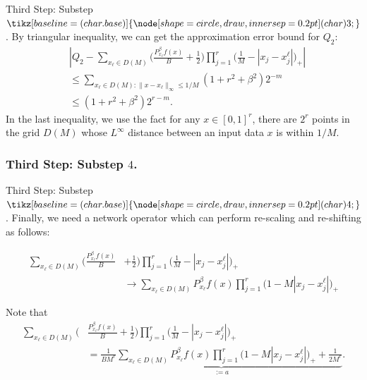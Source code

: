 \documentclass{if-beamer}
\newcommand*\circled[1]{\tikz[baseline=(char.base)]{
            \node[shape=circle,draw,inner sep=0.2pt] (char) {#1};}}
\begin{document}
\begin{frame}{Third Step: Substep $\circled{3}$.}
By triangular inequality, we can get the approximation error bound for $Q_2$:
\begin{align*}
    &\left| Q_{2} - \sum_{x_{\ell}\in D(M)}\bigg( \frac{P_{x_{\ell}}^{\beta}f(x)}{B}+\frac{1}{2}\bigg)\prod_{j=1}^{r}\bigg( \frac{1}{M} - |x_{j}-x_{j}^{\ell}| \bigg)_{+}  \right| \\
    &\leq \sum_{x_{\ell}\in D(M): \|x-x_{\ell}\|_{\infty}\leq 1/M} (1+r^{2}+\beta^{2}) 2^{-m} \\
    &\leq (1+r^{2}+\beta^{2}) 2^{r-m}.
\end{align*}
In the last inequality, we use the fact for any $x\in[0,1]^{r}$, there are $2^{r}$ points in the grid $D(M)$ whose $L^{\infty}$ distance between an input data $x$ is within $1/M$.
\end{frame}

\subsubsection{Third Step: Substep $4$.}
\begin{frame}{Third Step: Substep $\circled{4}$.}
Finally, we need a network operator which can perform re-scaling and re-shifting as follows:

\begin{align*}
    \sum_{x_{\ell}\in D(M)}\bigg( \frac{P_{x_{\ell}}^{\beta}f(x)}{B}&+\frac{1}{2}\bigg)\prod_{j=1}^{r}\bigg( \frac{1}{M} - |x_{j}-x_{j}^{\ell}| \bigg)_{+} \\
    &\rightarrow{\sum_{x_{\ell}\in D(M)} P_{x_{\ell}}^{\beta}f(x)\prod_{j=1}^{r}\bigg( 1 - M|x_{j}-x_{j}^{\ell}| \bigg)_{+}}
\end{align*}

Note that
\begin{align*}
    \sum_{x_{\ell}\in D(M)}\bigg( &\frac{P_{x_{\ell}}^{\beta}f(x)}{B}+\frac{1}{2}\bigg)\prod_{j=1}^{r}\bigg( \frac{1}{M} - |x_{j}-x_{j}^{\ell}| \bigg)_{+} \\
    &= \underbrace{\frac{1}{BM^{r}}\sum_{x_{\ell}\in D(M)} P_{x_{\ell}}^{\beta}f(x)\prod_{j=1}^{r}\bigg( 1 - M|x_{j}-x_{j}^{\ell}| \bigg)_{+}+\frac{1}{2M^{r}}}_{:=a}.
\end{align*}
\end{frame}
\end{document}
